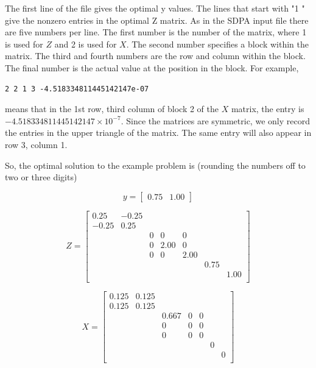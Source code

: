 \documentclass{article}
\begin{document}
The first line of the file gives the optimal y values.  The lines that
start with "1 " give the nonzero entries in the optimal Z matrix.  As in
the SDPA input file there are five numbers per line.  The first number
is the number of the matrix, where 1 is used for $Z$ and 2 is used
for $X$.  The second number specifies a block within the matrix.
The third and fourth numbers are the row and column within the block.
The final number is the actual value at the position in the block.
For example, 
\begin{verbatim}
2 2 1 3 -4.518334811445142147e-07 
\end{verbatim}
means that in the 1st row, third column of block 2 of the $X$ matrix, the
entry is $-4.518334811445142147\times 10^{-7}$. 
Since the matrices are symmetric, we only record
the entries in the upper triangle of the matrix.   The same entry will
also appear in row 3, column 1.  

So, the optimal solution to the example problem is (rounding the
numbers off to two or three digits)

\begin{equation}
y=\left[
\begin{array}{rr}
0.75 & 1.00 
\end{array}
\right]
\end{equation}

\begin{equation}
Z=\left[
\begin{array}{rrrrrrr}
 0.25 & -0.25 &   &   &   &   &    \\ 
 -0.25 & 0.25 &   &   &   &   &    \\ 
   &    & 0 & 0 & 0 &   &    \\ 
   &    & 0 & 2.00 & 0 &   &    \\ 
   &    & 0 & 0 & 2.00 &   &    \\ 
   &    &   &   &   & 0.75 &    \\ 
   &    &   &   &   &   & 1.00  \\ 
\end{array}
\right]
\end{equation}

\begin{equation}
X=\left[
\begin{array}{rrrrrrr}
 0.125 &  0.125 &   &   &   &   &    \\ 
 0.125 &  0.125 &   &   &   &   &    \\ 
   &    & 0.667 & 0 & 0 &   &    \\ 
   &    & 0 & 0 & 0 &   &    \\ 
   &    & 0 & 0 & 0 &   &    \\ 
   &    &   &   &   & 0 &    \\ 
   &    &   &   &   &   & 0  \\ 
\end{array}
\right]
\end{equation}
\end{document}
